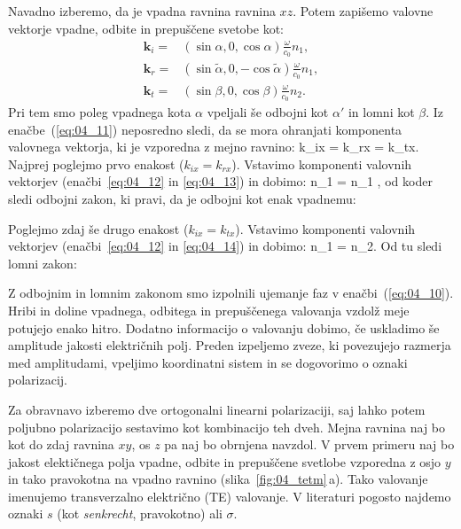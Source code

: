Navadno izberemo, da je vpadna ravnina ravnina $xz$. Potem zapišemo 
valovne vektorje vpadne, odbite in prepuščene svetobe kot:
\begin{align}
\mathbf{k}_i  =& \left( \sin\alpha, 0, \cos \alpha\right) \frac{\omega}{c_0} n_1, \label{eq:04_12}\\
\mathbf{k}_r  =& \left( \sin\tilde{\alpha}, 0, -\cos \tilde{\alpha}\right) \frac{\omega}{c_0} n_1,\label{eq:04_13}\\
\mathbf{k}_t  =& \left( \sin\beta, 0, \cos \beta\right) \frac{\omega}{c_0} n_2.\label{eq:04_14}
\end{align}
Pri tem smo poleg vpadnega kota $\alpha$ vpeljali še odbojni kot $\alpha'$ in lomni
kot $\beta$. Iz enačbe~(\ref{eq:04_11}) neposredno sledi, da se mora ohranjati komponenta
valovnega vektorja, ki je vzporedna z mejno ravnino:
\beq
k_{ix} = k_{rx} = k_{tx}.
\label{eq:04_15}
\eeq
Najprej poglejmo prvo enakost ($k_{ix} = k_{rx}$). Vstavimo komponenti valovnih
vektorjev (enačbi~\ref{eq:04_12} in \ref{eq:04_13}) in dobimo:
\beq
{} n_1 \sin \alpha  =   n_1 \sin\tilde{\alpha},
\label{eq:04_16}
\eeq
od koder sledi odbojni zakon, ki pravi, da je odbojni kot enak vpadnemu:

Poglejmo zdaj še drugo enakost ($k_{ix} = k_{tx}$). Vstavimo komponenti
valovnih vektorjev (enačbi~\ref{eq:04_12} in \ref{eq:04_14}) in dobimo:
\beq
{} n_1 \sin \alpha  =  n_2\sin\beta.
\label{eq:04_17}
\eeq
Od tu sledi lomni zakon:

Z odbojnim in lomnim zakonom smo izpolnili ujemanje faz v enačbi~(\ref{eq:04_10}). 
Hribi in doline vpadnega, odbitega in prepuščenega valovanja vzdolž meje 
potujejo enako hitro. Dodatno informacijo o valovanju dobimo, če
uskladimo še amplitude jakosti električnih polj. Preden izpeljemo
zveze, ki povezujejo razmerja med amplitudami, vpeljimo koordinatni sistem
in se dogovorimo o oznaki polarizacij.

Za obravnavo izberemo dve ortogonalni linearni polarizaciji, saj lahko potem
poljubno polarizacijo sestavimo kot kombinacijo teh dveh.
Mejna ravnina naj bo kot do zdaj ravnina $xy$, os $z$ pa naj bo obrnjena navzdol. 
V prvem primeru naj bo jakost elektičnega polja
vpadne, odbite in prepuščene svetlobe vzporedna z osjo $y$ in tako pravokotna
na vpadno ravnino (slika~\ref{fig:04_tetm}\,a). 
Tako valovanje imenujemo transverzalno električno (TE) valovanje. 
V literaturi pogosto najdemo oznaki $s$ (kot {\it senkrecht}, pravokotno) ali $\sigma$.

